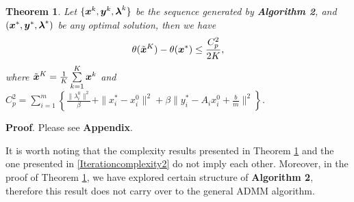 \documentclass{mcom-l}
\newtheorem{theorem}{Theorem}[section]
\theoremstyle{definition}
\theoremstyle{remark}
\numberwithin{equation}{section}
\begin{document}
\begin{theorem}\label{ComplexityObjective}
Let $\{ {{\mbox{\boldmath $x$}}}^k, {{\mbox{\boldmath $y$}}}^k, {{\mbox{\boldmath $\lambda$}}}^k \}$ be the sequence generated by {\bf{Algorithm 2}}, and $({{\mbox{\boldmath $x$}}}^*,{{\mbox{\boldmath $y$}}}^*,{{\mbox{\boldmath $\lambda$}}}^*)$ be any optimal solution, then we have
$$
\theta(\tilde{{\mbox{\boldmath $x$}}}^K) - \theta({{\mbox{\boldmath $x$}}}^*) \le \frac{C_p^2}{2K},
$$
where $\tilde{{\mbox{\boldmath $x$}}}^K = \frac{1}{K}\sum\limits_{k=1}^K {{\mbox{\boldmath $x$}}}^k$ and $C_p^2 = \sum\limits_{i=1}^m \left\{ \frac{\|\lambda_i^0\|^2}{\beta} + \|x_i^* - x_i^0\|^2 + \beta \| y_i^* - A_i x_i^0 + \frac{b}{m} \|^2 \right\}$.
\end{theorem}
{\bf{Proof}}. Please see {\bf Appendix}.

It is worth noting that the complexity results presented in Theorem \ref{ComplexityObjective} and the one presented in \eqref{Iterationcomplexity2} do not imply each other. Moreover, in the proof of Theorem \ref{ComplexityObjective}, we have explored certain structure of {\bf Algorithm 2}, therefore this result does not carry over to the general ADMM algorithm.
\end{document}
